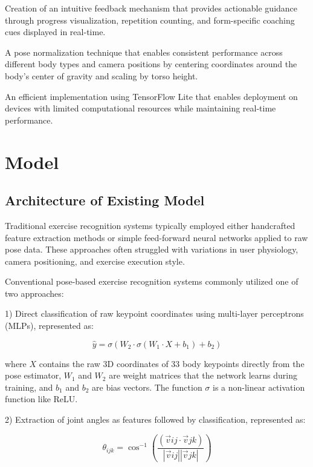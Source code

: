 \documentclass[11pt]{article}
\begin{document}
Creation of an intuitive feedback mechanism that provides actionable guidance through progress visualization, repetition counting, and form-specific coaching cues displayed in real-time.

A pose normalization technique that enables consistent performance across different body types and camera positions by centering coordinates around the body's center of gravity and scaling by torso height.

An efficient implementation using TensorFlow Lite that enables deployment on devices with limited computational resources while maintaining real-time performance.

\section{Model}

\subsection{Architecture of Existing Model}
Traditional exercise recognition systems typically employed either handcrafted feature extraction methods or simple feed-forward neural networks applied to raw pose data. These approaches often struggled with variations in user physiology, camera positioning, and exercise execution style.

Conventional pose-based exercise recognition systems commonly utilized one of two approaches:

1) Direct classification of raw keypoint coordinates using multi-layer perceptrons (MLPs), represented as:

\begin{equation}
\hat{y} = \sigma(W_2 \cdot \sigma(W_1 \cdot X + b_1) + b_2)
\end{equation}

where $X$ contains the raw 3D coordinates of 33 body keypoints directly from the pose estimator, $W_1$ and $W_2$ are weight matrices that the network learns during training, and $b_1$ and $b_2$ are bias vectors. The function $\sigma$ is a non-linear activation function like ReLU.

2) Extraction of joint angles as features followed by classification, represented as:

\begin{equation}
\theta_{ijk} = \cos^{-1}\left(\frac{(\vec{v}{ij} \cdot \vec{v}{jk})}{|\vec{v}{ij}||\vec{v}{jk}|}\right)
\end{equation}
\end{document}

